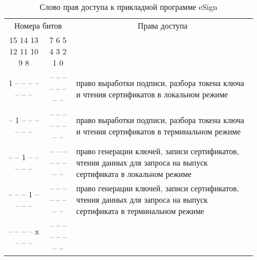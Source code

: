 \begin{table}[h!]
\caption{Слово прав доступа к прикладной программе eSign}
\label{Table.DATA.SMTAccess}
\begin{tabular}{|c|c|p{9cm}|}
\hline
\multicolumn{2}{|c|}{Номера битов}&
\multicolumn{1}{c|}{Права доступа}\\
\cline{1-2}
15 14 13 12 11 10 9 8 & 7  6  5  4  3  2  1  0 &	\\
\hline
\hline 
1 \hspace{0.075cm} – \hspace{0.075cm} – \hspace{0.075cm} – 
\hspace{0.075cm} – \hspace{0.075cm} – – – &  –  –  –  –  –  –  –  – & 
право выработки подписи, разбора токена ключа и чтения сертификатов 
в локальном режиме\\ 
\hline 
– \hspace{0.075cm} 1 \hspace{0.075cm} – \hspace{0.075cm} – 
\hspace{0.075cm} – \hspace{0.075cm} – – – &  –  –  –  –  –  –  –  – & 
право выработки подписи, разбора токена ключа и чтения сертификатов 
в терминальном режиме\\ 
\hline 
– \hspace{0.075cm} – \hspace{0.075cm} 1 \hspace{0.075cm} – 
\hspace{0.075cm} – \hspace{0.075cm} – – – &  –  –  –  –  –  –  –  – & 
право генерации ключей, записи сертификатов, 
чтения данных для запроса на выпуск сертификата
в локальном режиме\\ 
\hline 
– \hspace{0.075cm} – \hspace{0.075cm} – \hspace{0.075cm} 1 
\hspace{0.075cm} – \hspace{0.075cm} – – – &  –  –  –  –  –  –  –  – & 
право генерации ключей, записи сертификатов, 
чтения данных для запроса на выпуск сертификата
в терминальном режиме\\ 
\hline 
– \hspace{0.075cm} – \hspace{0.075cm} – \hspace{0.075cm} – 
\hspace{0.075cm} x \hspace{0.075cm} – – – &  –  –  –  –  –  –  –  – & 

\end{tabular}
\end{table}
